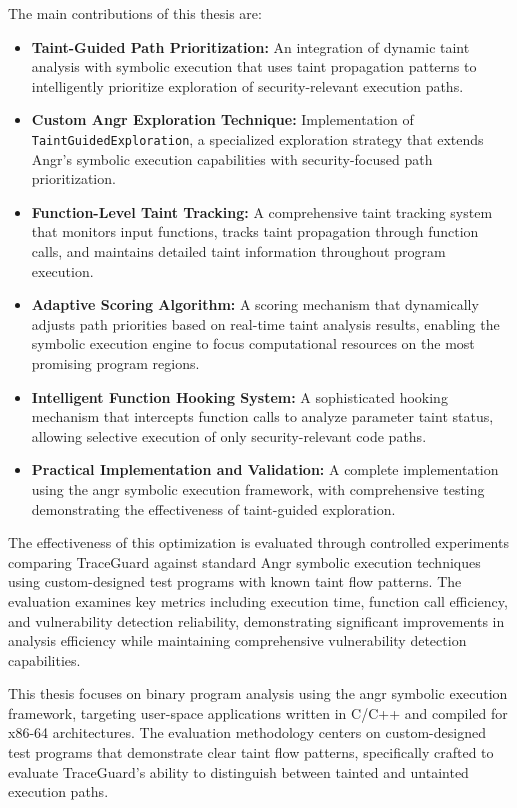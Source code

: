 The main contributions of this thesis are:

\begin{itemize}
    \item \textbf{Taint-Guided Path Prioritization:} An integration of dynamic taint analysis with symbolic execution that uses taint propagation patterns to intelligently prioritize exploration of security-relevant execution paths.
    \item \textbf{Custom Angr Exploration Technique:} Implementation of\\ \texttt{TaintGuidedExploration}, a specialized exploration strategy that extends Angr's symbolic execution capabilities with security-focused path prioritization.
    \item \textbf{Function-Level Taint Tracking:} A comprehensive taint tracking system that monitors input functions, tracks taint propagation through function calls, and maintains detailed taint information throughout program execution.
    \item \textbf{Adaptive Scoring Algorithm:} A scoring mechanism that dynamically adjusts path priorities based on real-time taint analysis results, enabling the symbolic execution engine to focus computational resources on the most promising program regions.
    \item \textbf{Intelligent Function Hooking System:} A sophisticated hooking mechanism that intercepts function calls to analyze parameter taint status, allowing selective execution of only security-relevant code paths.
    \item \textbf{Practical Implementation and Validation:} A complete implementation using the angr symbolic execution framework, with comprehensive testing demonstrating the effectiveness of taint-guided exploration.
\end{itemize}

The effectiveness of this optimization is evaluated through controlled experiments comparing TraceGuard against standard Angr symbolic execution techniques using custom-designed test programs with known taint flow patterns. The evaluation examines key metrics including execution time, function call efficiency, and vulnerability detection reliability, demonstrating significant improvements in analysis efficiency while maintaining comprehensive vulnerability detection capabilities.

This thesis focuses on binary program analysis using the angr symbolic execution framework, targeting user-space applications written in C/C++ and compiled for x86-64 architectures. The evaluation methodology centers on custom-designed test programs that demonstrate clear taint flow patterns, specifically crafted to evaluate TraceGuard's ability to distinguish between tainted and untainted execution paths.

